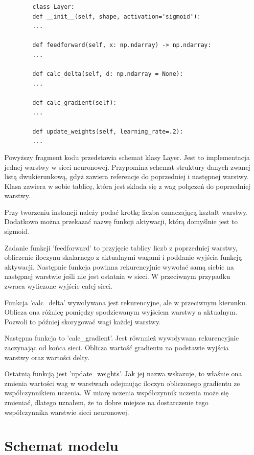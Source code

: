 \documentclass{report}
\begin{document}
    \begin{lstlisting}
        class Layer:
        def __init__(self, shape, activation='sigmoid'):
        ...

        def feedforward(self, x: np.ndarray) -> np.ndarray:
        ...

        def calc_delta(self, d: np.ndarray = None):
        ...

        def calc_gradient(self):
        ...

        def update_weights(self, learning_rate=.2):
        ...
    \end{lstlisting}
    \label{Schemat klasy Layer}

    Powyższy fragment kodu przedstawia schemat klasy Layer.
    Jest to implementacja jednej warstwy w sieci neuronowej.
    Przypomina schemat struktury danych zwanej listą dwukierunkową, gdyż zawiera referencje do poprzedniej i następnej warstwy.
    Klasa zawiera w sobie tablicę, która jest składa się z wag połączeń do poprzedniej warstwy.

    Przy tworzeniu instancji należy podać krotkę liczba oznaczającą kształt warstwy.
    Dodatkowo można przekazać nazwę funkcji aktywacji, którą domyślnie jest to sigmoid.

    Zadanie funkcji 'feedforward' to przyjęcie tablicy liczb z poprzedniej warstwy, obliczenie iloczynu skalarnego z aktualnymi wagami i poddanie wyjścia funkcją aktywacji.
    Następnie funkcja powinna rekurencyjnie wywołać samą siebie na następnej warstwie jeśli nie jest ostatnia w sieci.
    W przeciwnym przypadku zwraca wyliczone wyjście całej sieci.

    Funkcja 'calc\_delta' wywoływana jest rekurencyjne, ale w przeciwnym kierunku.
    Oblicza ona różnicę pomiędzy spodziewanym wyjściem warstwy a aktualnym.
    Pozwoli to później skorygować wagi każdej warstwy.

    Następna funkcja to 'calc\_gradient'.
    Jest równnież wywoływana rekurencyjnie zaczynając od końca sieci.
    Oblicza wartość gradientu na podstawie wyjścia warstwy oraz wartości delty.

    Ostatnią funkcją jest 'update\_weights'.
    Jak jej nazwa wskazuje, to właśnie ona zmienia wartości wag w warstwach odejmując iloczyn obliczonego gradientu ze współczynnikiem uczenia.
    W miarę uczenia współczynnik uczenia może się zmieniać, dlatego uznałem, że to dobre miejsce na dostarczenie tego współczynnika warstwie sieci neuronowej.


    \section{Schemat modelu}
\end{document}
